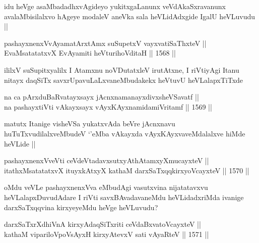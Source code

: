 \begin{artha}
idu heVge asaMbadadhxvAgideyo yukitxgaLanunx veVdAkaSxravanunx avalaMbisilalxvo hAgeye modaleV aneVka sala heVLidAdxgide IgalU heVLuvudu ||
\end{artha}


\begin{shl}
pashayxnenxVvAyamatArx\s \s tAmx suSupetxV vayxvatiSaThxteV ||  \\
EvaMsatatatxvX EvAyamiti heVturihoVditaH ||  1568 ||  
\end{shl}

\begin{artha}
ililxV suSupitxyalilx I Atamxnu noVDutatxleV irutAtxne, I riVtiyAgi Itanu nitayx daqSiTx savxrUpavuLaLxvaneMbudakekx heVtuvU heVLalapxTiTxde
\end{artha}

\begin{shl}
na ca pArxduBaRvatayxsayx jAcnxnamanayxdivxsheVSavatf ||  \\
na pashayxtiVti vAkayxsayx vAyxKAyxnamidamiVritamf ||  1569 ||  
\end{shl}

\begin{artha}
matutx Itanige visheVSa yukatxvAda beVre jAcnxnavu huTuTxvudilalxveMbudeV `\stext'eMba vAkayxda vAyxKAyxvaveMdalalxve hiMde heVLide ||
\end{artha}

\begin{shl}
pashayxnenxVveVti ceVdeVtadavxsutxyAthAtamxyXmucayxteV || \\
itathxMsatatatxvX ituyxkAtxyX kathaM darxSaTxqqkirxyoVcayxteV ||  1570 ||  
\end{shl}

\begin{artha}
oMdu veVLe pashayxnenxVva eMbudAgi vasutxvina nijatatavxvu heVLalapxDuvudAdare I riVti savxBAvadavaneMdu heVLidadxriMda ivanige darxSaTxqqvina kirxyeyeMdu heVge heVLuvudu? 
\end{artha}


\begin{shl}
darxSaTxrXdhiVnA kirxyAdaqSiTxriti ceVdaBxvatoVcayxteV ||  \\
kathaM vipariloVpoV\s sAyxH kirxyAtevxV sati vAyaRteV ||  1571 ||  
\end{shl}


